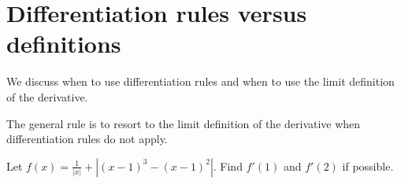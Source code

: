 \documentclass[../main.tex]{subfiles}
\begin{document}
 \section{Differentiation rules versus definitions}

We discuss when to use differentiation rules and when to use the limit definition of the derivative.

The general rule is to resort to the limit definition of the derivative when differentiation rules do not apply. 

\begin{example}
  Let \(f(x) = \frac{1}{|x|} + \left|(x-1)^{3}-(x-1)^{2}\right|\). Find \(f'(1)\) and \(f'(2)\) if possible.
  
  \blanks*
\end{example}
\clearpage


  


\end{document}

